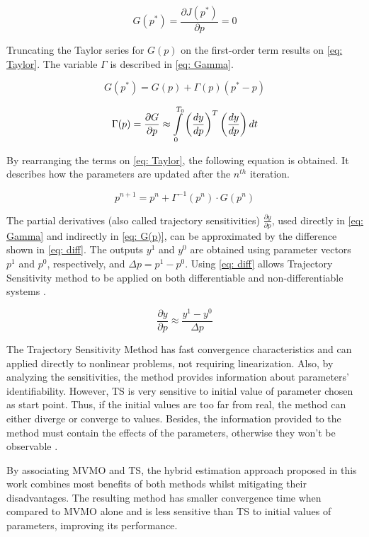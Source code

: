 \begin{equation}
	G(p^{*}) = \frac{\partial J(p^{*})}{\partial p} = 0
	\label{eq: G(p)}
\end{equation}

Truncating the Taylor series for $G(p)$ on the first-order term results on \eqref{eq: Taylor}. The variable $\Gamma$ is described in \eqref{eq: Gamma}.

\begin{equation}
	G(p^{*}) = G(p) + \Gamma (p)(p^{*} - p)
	\label{eq: Taylor}
\end{equation}

\begin{equation}
	\Gamma (p) = \frac{\partial G}{\partial p} \approx \int\displaylimits_{0}^{T_{0}} \left(\frac{dy}{dp}\right)^{T} \left(\frac{dy}{dp}\right) dt
	\label{eq: Gamma}
\end{equation}

By rearranging the terms on \eqref{eq: Taylor}, the following equation is obtained. It describes how the parameters are updated after the $n^{th}$ iteration.

\begin{equation}
	p^{n+1} = p^{n} + \Gamma^{-1}(p^{n})\cdot G(p^{n})
\end{equation}

The partial derivatives (also called trajectory sensitivities) $\frac{\partial y}{\partial p}$, used directly in \eqref{eq: Gamma} and indirectly in \eqref{eq: G(p)}, can be approximated by the difference shown in \eqref{eq: diff}. The outputs $y^{1}$ and $y^{0}$ are obtained using parameter vectors $p^{1}$ and $p^{0}$, respectively, and $\Delta p = p^{1} - p^{0}$. Using \eqref{eq: diff} allows Trajectory Sensitivity method to be applied on both differentiable and non-differentiable systems \cite{Benchluch1993}.
 
\begin{equation}
	\frac{\partial y}{\partial p} \approx \frac{y^{1} - y^{0}}{\Delta p}
	\label{eq: diff}
\end{equation}

The Trajectory Sensitivity Method has fast convergence characteristics and can applied directly to nonlinear problems, not requiring linearization. Also, by analyzing the sensitivities, the method provides information about parameters' identifiability. However, TS is very sensitive to initial value of parameter chosen as start point. Thus, if the initial values are too far from real, the method can either diverge or converge to  values. Besides, the information provided to the method must contain the effects of the parameters, otherwise they won't be observable \cite{Benchluch1993}.

By associating MVMO and TS, the hybrid estimation approach proposed in this work combines most benefits of both methods whilst mitigating their disadvantages. The resulting method has smaller convergence time when compared to MVMO alone and is less sensitive than TS to initial values of parameters, improving its performance.
